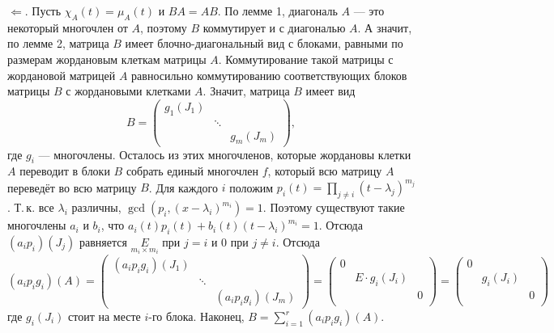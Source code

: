 \begin{solution}
    $\Leftarrow$. Пусть $\chi_A(t) = \mu_A(t)$ и $BA = AB$. По лемме 1, диагональ $A$ --- это некоторый многочлен от $A$, поэтому $B$ коммутирует и с диагональю $A$. А значит, по лемме 2, матрица $B$ имеет блочно-диагональный вид с блоками, равными по размерам жордановым клеткам матрицы $A$. Коммутирование такой матрицы с жордановой матрицей $A$ равносильно коммутированию соответствующих блоков матрицы $B$ с жордановыми клетками $A$. Значит, матрица $B$ имеет вид
    \[
        B =
        \begin{pmatrix}
            g_1(J_1) & & \\
             & \ddots & \\
             & & g_m(J_m)
        \end{pmatrix},
    \]
    где $g_i$ --- многочлены. Осталось из этих многочленов, которые жордановы клетки $A$ переводит в блоки $B$ собрать единый многочлен $f$, который всю матрицу $A$ переведёт во всю матрицу $B$. Для каждого $i$ положим $p_i(t) = \prod\limits_{j \ne i}(t - \lambda_j)^{m_j}$. Т.\,к. все $\lambda_i$ различны, $\gcd(p_i, (x - \lambda_i)^{m_i}) = 1$. Поэтому существуют такие многочлены $a_i$ и $b_i$, что $a_i(t)p_i(t) + b_i(t)(t - \lambda_i)^{m_i} = 1$. Отсюда $(a_ip_i)(J_{j})$ равняется $\underset{m_i \times m_i}{E}$ при $j = i$ и $0$ при $j \ne i$. Отсюда
    \[
        (a_ip_ig_i)(A) =
        \begin{pmatrix}
            (a_ip_ig_i)(J_1) & & \\
             & \ddots & \\
             & & (a_ip_ig_i)(J_m)
        \end{pmatrix} = 
        \begin{pmatrix}
            0 & & \\
            & E \cdot g_i(J_i) & \\
             & & 0\\
        \end{pmatrix} =
        \begin{pmatrix}
            0 & & \\
            & g_i(J_i) & \\
             & & 0\\
        \end{pmatrix}
    \]
    где $g_i(J_i)$ стоит на месте $i$-го блока. Наконец, $B = \sum\limits_{i = 1}^r(a_ip_ig_i)(A)$.


\end{solution}
